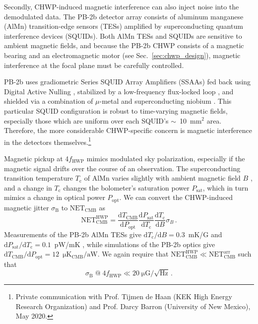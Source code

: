 Secondly, CHWP-induced magnetic interference can also inject noise into the demodulated data. The PB-2b detector array consists of aluminum manganese (AlMn) transition-edge sensors (TESs) amplified by superconducting quantum interference devices (SQUIDs). Both AlMn TESs and SQUIDs are sensitive to ambient magnetic fields, and because the PB-2b CHWP consists of a magnetic bearing and an electromagnetic motor (see Sec.~\ref{sec:chwp_design}), magnetic interference at the focal plane must be carefully controlled.

PB-2b uses gradiometric Series SQUID Array Amplifiers (SSAAs) \cite{stiehl_time-division_2011} fed back using Digital Active Nulling \cite{haan_improved_2012}, stabilized by a low-frequency flux-locked loop \cite{Bender2014}, and shielded via a combination of $\mu$-metal and superconducting niobium \cite{xu_combined_1987}.  This particular SQUID configuration is robust to time-varying magnetic fields, especially those which are uniform over each SQUID's $\sim$~10~$\mathrm{mm^{2}}$ area. Therefore, the more considerable CHWP-specific concern is magnetic interference in the detectors themselves.\footnote{Private communication with Prof. Tijmen de Haan (KEK High Energy Research Organization) and Prof. Darcy Barron (University of New Mexico), May 2020.}

Magnetic pickup at 4$f_{\mathrm{HWP}}$ mimics modulated sky polarization, especially if the magnetic signal drifts over the course of an observation. The superconducting transition temperature $T_{\mathrm{c}}$ of AlMn varies slightly with ambient magnetic field $B$ \cite{deiker_superconducting_2004}, and a change in $T_{\mathrm{c}}$ changes the bolometer's saturation power $P_{\mathrm{sat}}$, which in turn mimics a change in optical power $P_{\mathrm{opt}}$. We can convert the CHWP-induced magnetic jitter $\sigma_{\mathrm{B}}$ to $\mathrm{NET_{CMB}}$ as
\begin{equation}
    \mathrm{NET_{CMB}^{HWP}} = \frac{\mathrm{d} T_{\mathrm{CMB}}}{\mathrm{d} P_{\mathrm{opt}}} \frac{\mathrm{d} P_{\mathrm{sat}}}{\mathrm{d} T_{\mathrm{c}}} \frac{\mathrm{d} T_{\mathrm{c}}}{\mathrm{d} B} \sigma_{B} \, .
    \label{eq:pbias_bfield}
\end{equation}
\noindent
Measurements of the PB-2b AlMn TESs give $\mathrm{d} T_{\mathrm{c}} / \mathrm{d} B = 0.3$~mK/G \cite{vavagiakis_magnetic_2018} and $\mathrm{d} P_{\mathrm{sat}} / \mathrm{d} T_{\mathrm{c}} = 0.1$~pW/mK \cite{westbrook_polarbear-2_2018}, while simulations of the PB-2b optics \cite{hill_bolocalc_2018} give $\mathrm{d} T_{\mathrm{CMB}} / \mathrm{d} P_{\mathrm{opt}} = 12$~$\mathrm{\mu K_{CMB} / aW}$. We again require that $\mathrm{NET_{CMB}^{HWP}} \ll \mathrm{NET_{CMB}^{arr}}$ such that 
\begin{equation}
    \sigma_{\mathrm{B}} \; @ \; 4f_{\mathrm{HWP}} \ll 20 \; \mathrm{\mu G / \sqrt{Hz}} \, .
    \label{eq:mag_requirement}
\end{equation}
\noindent


